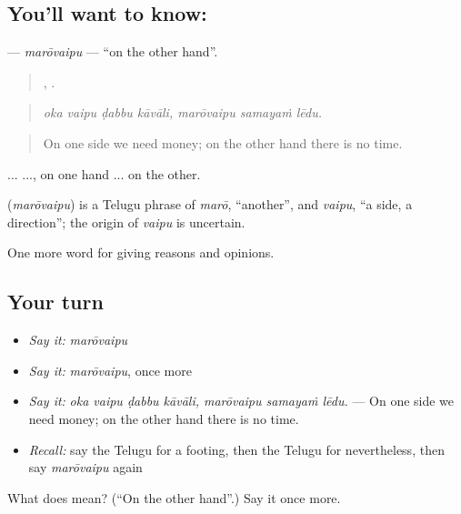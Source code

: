 \subsection*{You'll want to know: }
\textbf{} — \emph{marōvaipu} — \textquotedblleft{}on the other hand\textquotedblright{}.

\begin{quote}
   ,   .
\end{quote}

\begin{quote}
\emph{oka vaipu ḍabbu kāvāli, marōvaipu samayaṁ lēdu.}
\end{quote}

\begin{quote}
On one side we need money; on the other hand there is no time.
\end{quote}

  ...  ..., on one hand ... on the other.

\begin{cousinweb}
\textbf{} (\emph{marōvaipu}) is a Telugu phrase of \emph{marō}, \textquotedblleft{}another\textquotedblright{}, and \emph{vaipu}, \textquotedblleft{}a side, a direction\textquotedblright{}; the origin of \emph{vaipu} is uncertain.
\end{cousinweb}

\begin{grammarlens}[title={What you've built}]
One more word for giving reasons and opinions.
\end{grammarlens}

\subsection*{Your turn}
\begin{itemize}
\raggedright
  \item \emph{Say it:} \emph{marōvaipu}
  \item \emph{Say it:} \emph{marōvaipu}, once more
  \item \emph{Say it:} \emph{oka vaipu ḍabbu kāvāli, marōvaipu samayaṁ lēdu.} — On one side we need money; on the other hand there is no time.
  \item \emph{Recall:} say the Telugu for a footing, then the Telugu for nevertheless, then say \emph{marōvaipu} again
\end{itemize}

\begin{tcolorbox}[breakable,colback=teal!4,colframe=teal!35!black,title={Before you move on}]
What does  mean? (\textquotedblleft{}On the other hand\textquotedblright{}.) Say it once more.
\end{tcolorbox}
